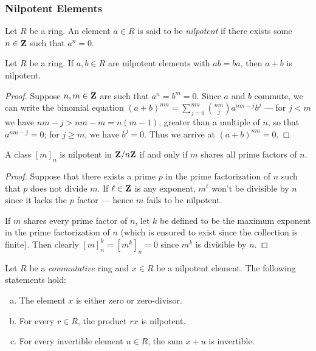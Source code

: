 \subsubsection{Nilpotent Elements}

%
\begin{definition}[Nilpotent]
    \label{def:nilpotent}
    Let \(R\) be a ring. An element \(a \in R\) is said to be \emph{nilpotent} if
    there exists some \(n \in \mathbf{Z}\) such that \(a^n = 0\).
\end{definition}
%

%
\begin{lemma}
    \label{lem:nilpotent-sum}
    Let \(R\) be a ring. If \(a, b \in R\) are nilpotent elements with \(a b = b
    a\), then \(a + b\) is nilpotent.
\end{lemma}
%

%
\begin{proof}
    Suppose \(n, m \in \mathbf{Z}\) are such that \(a^n = b^m = 0\). Since \(a\) and \(b\)
    commute, we can write the binomial equation
    \((a + b)^{n m} = \sum_{j=0}^{n m} \binom{nm}{j} a^{n m - j} b^j\) --- for
    \(j < m\) we have \(n m - j > nm - m = n (m - 1)\), greater than a
    multiple of \(n\), so that \(a^{n m - j} = 0\); for \(j \geq m\), we have
    \(b^j = 0\). Thus we arrive at \((a + b)^{n m} = 0\).
\end{proof}
%

%
\begin{lemma}
    \label{lem:nilpotent-in-Z/nZ}
    A class \([m]_n\) is nilpotent in \(\mathbf{Z}/n\mathbf{Z}\) if and only if \(m\) shares all
    prime factors of \(n\).
\end{lemma}
%

%
\begin{proof}
    Suppose that there exists a prime \(p\) in the prime factorization of \(n\) such
    that \(p\) does not divide \(m\). If \(\ell \in \mathbf{Z}\) is any exponent,
    \(m^{\ell}\) won't be divisible by \(n\) since it lacks the \(p\) factor ---
    hence \(m\) fails to be nilpotent.

    If \(m\) shares every prime factor of \(n\), let \(k\) be defined to be the
    maximum exponent in the prime factorization of \(n\) (which is ensured to exist
    since the collection is finite). Then clearly \([m]_n^k = [m^k]_n = 0\) since
    \(m^k\) is divisible by \(n\).
\end{proof}
%

%
\begin{lemma}
    \label{lem:properties-nilpotent-element-in-commutative-ring}
    Let \(R\) be a \emph{commutative} ring and \(x \in R\) be a nilpotent
    element. The following statements hold:
    \begin{enumerate}[(a)]\setlength\itemsep{0em}
        \item The element \(x\) is either zero or zero-divisor.

        \item For every \(r \in R\), the product \(r x\) is nilpotent.

        \item For every invertible element \(u \in R\), the sum \(x + u\) is invertible.
    \end{enumerate}
\end{lemma}
%

